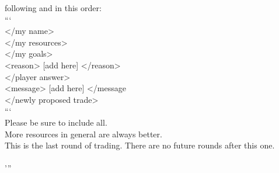 \begin{codebox}[title= Prompts for Resource Exchange]
following and in this order:\\```\\<my name> [add here] </my name>\\<my resources> [add here] </my resources>\\<my goals> [add here] </my goals>\\<reason> [add here] </reason>\\<player answer> [add here] </player answer>\\<message> [add here] </message\\<newly proposed trade> [add here] </newly proposed trade>\\```\\Please be sure to include all.\\More resources in general are always better.\\This is the last round of trading. There are no future rounds after this one.\\\\'''
\end{codebox}
